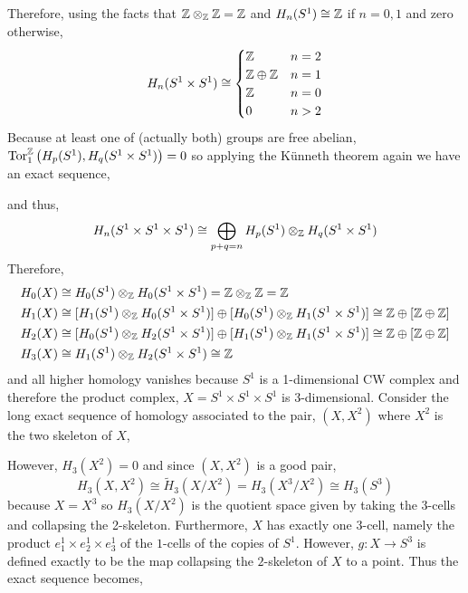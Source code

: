 \documentclass[12pt]{extarticle}
\begin{document}
Therefore, using the facts that $\mathbb{Z} \otimes_{\mathbb{Z}} \mathbb{Z} = \mathbb{Z}$ and $H_n(S^1) \cong \mathbb{Z}$ if $n = 0,1$ and zero otherwise,
\[ H_n(S^1 \times S^1) \cong 
\begin{cases}
\mathbb{Z} & n = 2
\\
\mathbb{Z} \oplus \mathbb{Z} & n = 1
\\
\mathbb{Z} & n = 0 
\\
0 & n > 2
\end{cases}
\]
Because at least one of (actually both) groups are free abelian, $\mathrm{Tor}^{\mathbb{Z}}_{1} \left( H_p(S^1), H_q(S^1 \times S^1) \right) = 0$ so applying the K\"{u}nneth theorem again we have an exact sequence,
\begin{center}
\end{center}  
and thus,
\[ H_n(S^1 \times S^1 \times S^1) \cong \bigoplus\limits_{p + q = n} H_p(S^1) \otimes_{\mathbb{Z}} H_q(S^1 \times S^1) \]
Therefore,
\begin{align*}
H_0(X) & \cong H_0(S^1) \otimes_{\mathbb{Z}} H_0(S^1 \times S^1) = \mathbb{Z} \otimes_{\mathbb{Z}} \mathbb{Z} = \mathbb{Z}
\\
H_1(X) & \cong [H_1(S^1) \otimes_{\mathbb{Z}} H_0(S^1 \times S^1)] \oplus [ H_0(S^1) \otimes_{\mathbb{Z}} H_1(S^1 \times S^1)] \cong \mathbb{Z} \oplus [\mathbb{Z} \oplus \mathbb{Z} ] 
\\
H_2(X) & \cong [H_0(S^1) \otimes_{\mathbb{Z}} H_2(S^1 \times S^1)] \oplus [H_1(S^1) \otimes_{\mathbb{Z}} H_1(S^1 \times S^1)] \cong \mathbb{Z} \oplus [\mathbb{Z} \oplus \mathbb{Z}] 
\\
H_3(X) & \cong H_1(S^1) \otimes_{\mathbb{Z}} H_2(S^1 \times S^1) \cong \mathbb{Z}
\end{align*}
and all higher homology vanishes because $S^1$ is a 1-dimensional CW complex and therefore the product complex, $X = S^1 \times S^1 \times S^1$ is 3-dimensional. Consider the long exact sequence of homology associated to the pair, $(X, X^2)$ where $X^2$ is the two skeleton of $X$,
\begin{center}
\end{center}
However, $H_3(X^2) = 0$ and since $(X, X^2)$ is a good pair,
\[H_3(X, X^2) \cong \tilde{H}_3(X/X^2) = H_3(X^3 / X^2) \cong H_3(S^3)\]
because $X = X^3$ so $H_3(X / X^2)$ is the quotient space given by taking the 3-cells and collapsing the 2-skeleton. Furthermore, $X$ has exactly one 3-cell, namely the product $e_1^1 \times e_2^1 \times e_3^1$ of the $1$-cells of the copies of $S^1$. However, $g : X \to S^3$ is defined exactly to be the map collapsing the $2$-skeleton of $X$ to a point. Thus the exact sequence becomes,
\end{document}
